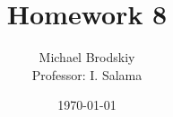 


\title{Homework 8}
\date{\today}
\author{Michael Brodskiy\\ \small Professor: I. Salama}



\maketitle

